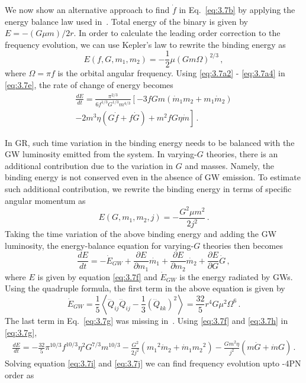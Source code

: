 \documentclass[prd,twocolumn,nofootinbib]{revtex4-1}
\begin{document}
  \hspace{15.5pt} We now show an alternative approach to find $\dot f$ in Eq.~\eqref{eq:3.7b} by applying the energy balance law used in~\cite{Yunes:2009bv}. Total energy of the binary is given by $E=-(G\mu m)/2r$. In order to calculate the leading order correction to the frequency evolution, we can use Kepler's law to rewrite the binding energy as 
 \begin{equation}\label{eq:3.7e}
 E(f,G,m_1,m_2)=-\frac{1}{2}\mu (Gm\Omega)^{2/3}\,,
 \end{equation}
 where $\Omega=\pi f$ is the orbital angular frequency. Using \eqref{eq:3.7a2} - \eqref{eq:3.7a4} in  \eqref{eq:3.7e}, the rate of change of energy becomes
 \begin{align}\label{eq:3.7j}
 \frac{d E}{d t}=\frac{\pi^{2/3}}{6f^{1/3}G^{1/3}m^{4/3}}\left[-3fGm(\dot{m}_1m_2+m_1\dot{m}_2)\right.\nonumber\\ \left.-2m^3\eta(G\dot{f}+f\dot{G})+m^2fG\eta\dot{m}\right]\,.
 \end{align}
 
In GR, such time variation in the binding energy needs to be balanced with the GW luminosity emitted from the system. In varying-$G$ theories, there is an additional contribution due to the variation in $G$ and masses. Namely, the binding energy is not conserved even in the absence of GW emission. To estimate such additional contribution, we rewrite the binding energy in terms of specific angular momentum as
 \begin{equation}\label{eq:3.7f}
 E(G,m_1,m_2,j)=-\frac{G^2 \mu  m^2}{2 j^2}\,.
 \end{equation}
 \hspace*{15.5pt} Taking the time variation of the above binding energy and adding the GW luminosity, the energy-balance equation for varying-$G$ theories then becomes
 \begin{equation}\label{eq:3.7g}
\frac{d E}{d t}=-\dot{E}_{GW}+\frac{\partial E}{\partial m_1}\dot{m_1}+\frac{\partial E}{\partial m_2}\dot{m_2}+\frac{\partial E}{\partial G}\dot{G}\,,
 \end{equation}
 where $E$ is given by equation \eqref{eq:3.7f} and $\dot{E}_{GW}$ is the energy radiated by GWs. Using the quadruple formula, the first term in the above equation is given by
 \begin{equation}\label{eq:3.7h}
 \dot{E}_{GW}=\frac{1}{5}\left \langle\dddot{Q}_{ij}\dddot{Q}_{ij}-\frac{1}{3}(\dddot{Q}_{kk})^2\right \rangle=\frac{32}{5} r^4 G \mu ^2 \Omega ^6\,.
 \end{equation}
 The last term in Eq.~\eqref{eq:3.7g} was missing in~\cite{Yunes:2009bv}.
 Using \eqref{eq:3.7f} and \eqref{eq:3.7h} in \eqref{eq:3.7g},
 \begin{align}\label{eq:3.7i}
\frac{d E}{d t}=- \frac{32}{5} \pi ^{10/3} f^{10/3} \eta ^2 G^{7/3} m^{10/3}-\frac{G^2}{2j^2}({m_1}^2\dot{m}_2+\dot{m}_1{m_2}^2)-\frac{Gm^2\eta}{j^2}(m\dot{G}+\dot{m}G)\,.
 \end{align}
 \hspace{15.5pt}Solving equation \eqref{eq:3.7i} and \eqref{eq:3.7j} we can find frequency evolution upto -4PN order as
 
\end{document}
